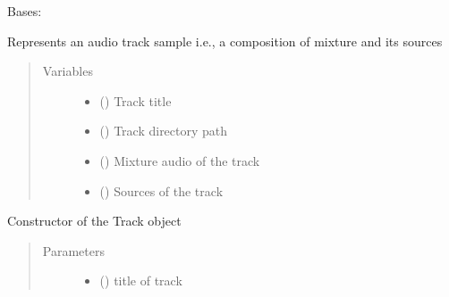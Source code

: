 \documentclass[letterpaper,10pt,english]{sphinxmanual}
\begin{document}
\begin{fulllineitems}
\label{\detokenize{docs/source/preprocess:preprocess.track_classes.Track}}
Bases: 

Represents an audio track sample i.e., a composition of mixture and its sources
\begin{quote}\begin{description}
\item[{Variables}] \leavevmode\begin{itemize}
\item {} 
{\hyperref[\detokenize{docs/source/application.model:application.model.Track.title}]{}} () \textendash{} Track title

\item {} 
 () \textendash{} Track directory path

\item {} 
 ({\hyperref[\detokenize{docs/source/preprocess:preprocess.track_classes.Audio}]{}}) \textendash{} Mixture audio of the track

\item {} 
 (\sphinxstyleliteralemphasis{\sphinxupquote{{[}}}{\hyperref[\detokenize{docs/source/preprocess:preprocess.track_classes.Audio}]{\sphinxcrossref{\sphinxstyleliteralemphasis{\sphinxupquote{Audio}}}}}\sphinxstyleliteralemphasis{\sphinxupquote{{]}}}) \textendash{} Sources of the track

\end{itemize}

\end{description}\end{quote}

\begin{fulllineitems}
\label{\detokenize{docs/source/preprocess:preprocess.track_classes.Track.__init__}}
Constructor of the Track object
\begin{quote}\begin{description}
\item[{Parameters}] \leavevmode\begin{itemize}
\item {} 
 () \textendash{} title of track


\end{itemize}
\end{description}
\end{quote}
\end{fulllineitems}
\end{fulllineitems}
\end{document}
